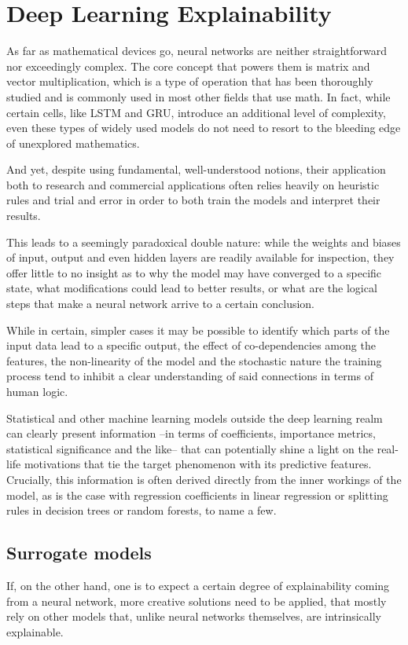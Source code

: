 \section{Deep Learning Explainability}
As far as mathematical devices go, neural networks are neither straightforward nor exceedingly complex. The core concept that powers them is matrix and vector multiplication, which is a type of operation that has been thoroughly studied and is commonly used in most other fields that use math. In fact, while certain cells, like LSTM and GRU, introduce an additional level of complexity, even these types of widely used models do not need to resort to the bleeding edge of unexplored mathematics.

And yet, despite using fundamental, well-understood notions, their application both to research and commercial applications often relies heavily on heuristic rules and trial and error in order to both train the models and interpret their results.

This leads to a seemingly paradoxical double nature: while the weights and biases of input, output and even hidden layers are readily available for inspection, they offer little to no insight as to why the model may have converged to a specific state, what modifications could lead to better results, or what are the logical steps that make a neural network arrive to a certain conclusion.

While in certain, simpler cases it may be possible to identify which parts of the input data lead to a specific output, the effect of co-dependencies among the features, the non-linearity of the model and the stochastic nature the training process tend to inhibit a clear understanding of said connections in terms of human logic. 

Statistical and other machine learning models outside the deep learning realm can clearly present information –in terms of coefficients, importance metrics, statistical significance and the like– that can potentially shine a light on the real-life motivations that tie the target phenomenon with its predictive features. Crucially, this information is often derived directly from the inner workings of the model, as is the case with regression coefficients in linear regression or splitting rules in decision trees or random forests, to name a few.

\subsection{Surrogate models}
If, on the other hand, one is to expect a certain degree of explainability coming from a neural network, more creative solutions need to be applied, that mostly rely on other models that, unlike neural networks themselves, are intrinsically explainable. 


